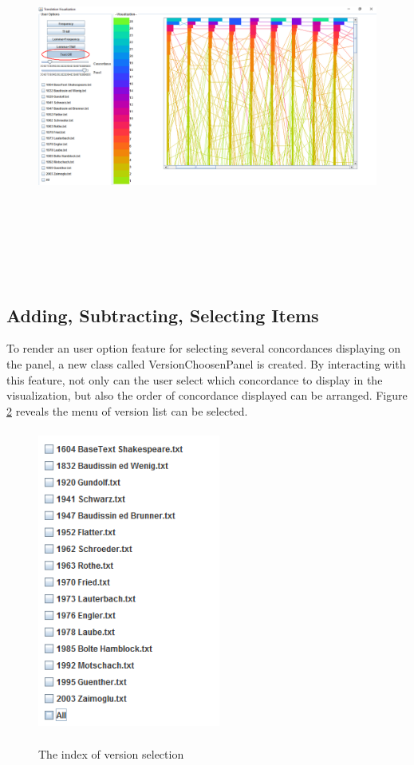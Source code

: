 \begin{figure}[H]
	\centering	
	\includegraphics[width=18cm, height=12cm]{Figs/Text-On-Off}\\[1ex]
	\caption{}
	\label{fig:textOnOff}
\end{figure} 

\subsection{Adding, Subtracting, Selecting Items}

To render an user option feature for selecting several concordances displaying on the panel, a new class called VersionChoosenPanel is created. By interacting with this feature, not only can the user select which concordance to display in the visualization, but also the order of concordance displayed can be arranged. Figure
\ref{fig:versionChoosPanel} reveals the menu of version list can be selected. 
\begin{figure}[H]
	\centering	
	\includegraphics[width=6cm, height=10cm]{Figs/VersionChoosePanel}\\[1ex]
	\caption{The index of version selection}
	\label{fig:versionChoosPanel}
\end{figure} 

